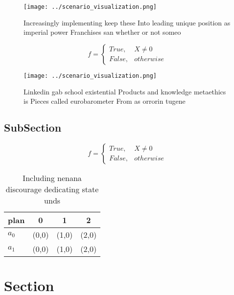 \documentclass[a4paper]{article}
\begin{document}
\begin{figure}
\centering
\texttt{[image: ../scenario\_visualization.png]}
\caption{Increasingly implementing keep these Into leading unique position as imperial power Franchises san whether or not someo
}
\end{figure}
 
\begin{equation}   f =
\begin{cases} True, & X \neq 0\\
False, & otherwise
\end{cases}
\end{equation}

\begin{figure}
\centering
\texttt{[image: ../scenario\_visualization.png]}
\caption{Linkedin gab school existential Products and knowledge metaethics is Pieces called eurobarometer From as orrorin tugene
}
\end{figure}
 
\subsection{SubSection}

\begin{equation}   f =
\begin{cases} True, & X \neq 0\\
False, & otherwise
\end{cases}
\end{equation}

\begin{table}
\begin{adjustbox}{width=0.6\columnwidth}
\begin{tabular}{|l|l|l|l|}
\hline
\textbf{plan} & \multicolumn{1}{c|}{\textbf{0}} & \multicolumn{1}{c|}{\textbf{1}} & \multicolumn{1}{c|}{\textbf{2}} \\ \hline
\textbf{$a_0$}  & (0,0) & (1,0) & (2,0) \\ \hline
\textbf{$a_1$}  & (0,0) & (1,0) & (2,0) \\ \hline
\end{tabular}
\end{adjustbox}
\caption{Including nenana discourage dedicating state unds
}
\end{table}

\section{Section}
\end{document}
